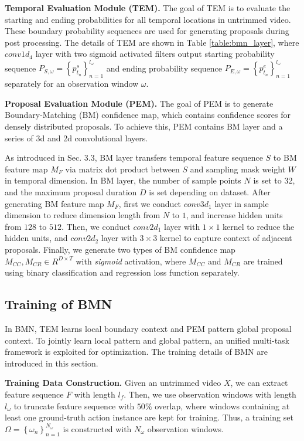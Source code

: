 \documentclass[10pt,twocolumn,letterpaper]{article}
\begin{document}
\noindent
\textbf{Temporal Evaluation Module (TEM).}
%
The goal of TEM is to evaluate the starting and ending probabilities for all temporal locations in untrimmed video. These boundary probability sequences are used for generating proposals during post processing.
%
The details of TEM are shown in Table \ref{table:bmn_layer}, where $conv1d_4$ layer with two sigmoid activated filters output starting probability sequence $P_{S,\omega}=\left \{ p^s_{t_n} \right \}_{n=1}^{l_{\omega}}$ and ending probability sequence $P_{E,\omega}=\left \{ p^e_{t_n} \right \}_{n=1}^{l_{\omega}}$ separately for an observation window ${\omega}$.

\noindent
\textbf{Proposal Evaluation Module (PEM).}
The goal of PEM is to generate Boundary-Matching (BM) confidence map, which contains  confidence scores for densely distributed proposals. To achieve this, PEM contains BM layer and a series of 3d and 2d convolutional layers.

As introduced in Sec. 3.3, BM layer transfers temporal feature sequence $S$ to BM feature map $M_F$ via matrix dot product between  $S$ and sampling mask weight $W$ in temporal dimension.
%
In BM layer, the number of  sample points $N$ is set to 32, and the maximum proposal duration $D$ is set depending on dataset.
%
After generating BM feature map $M_F$, first we conduct $conv3d_1$ layer in sample dimension to reduce dimension length from $N$ to $1$, and increase hidden units from $128$ to $512$. 
%
Then, we conduct $conv2d_1$ layer with $1\times1$ kernel to reduce the hidden units, and $conv2d_2$ layer with $3\times3$ kernel to capture context of adjacent proposals. Finally, we generate two types of BM confidence map $M_{CC}, M_{CR} \in R^{D\times T}$ with \emph{sigmoid} activation, where $M_{CC}$ and $M_{CR}$ are trained using binary classification and regression loss function separately.



\subsection{Training of BMN}

In BMN, TEM learns local boundary context and PEM pattern global proposal  context.
%
To jointly learn local pattern and global pattern, an unified multi-task framework is exploited for optimization. The training details of BMN are introduced in this section.


\noindent
\textbf{Training Data Construction.}
Given an untrimmed video $X$, we can extract feature sequence $F$ with length $l_f$.
%
Then, we use observation windows with length $l_{\omega}$ to truncate feature sequence with $50\%$ overlap, where windows containing at least one ground-truth action instance are kept for training.
%
Thus, a training set  $\Omega= \left \{ \omega_n \right \}_{n=1}^{N_{\omega }}$ is constructed with $N_{\omega}$ observation windows.
\end{document}
